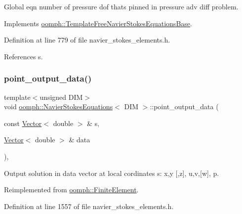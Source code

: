 Global eqn number of pressure dof that\textquotesingle{}s pinned in pressure adv diff problem. 



Implements \hyperlink{classoomph_1_1TemplateFreeNavierStokesEquationsBase_a7b4c21107580d63e358ae7469f04399c}{oomph\+::\+Template\+Free\+Navier\+Stokes\+Equations\+Base}.



Definition at line 779 of file navier\+\_\+stokes\+\_\+elements.\+h.



References s.

\mbox{\label{classoomph_1_1NavierStokesEquations_afd6f8376bf83a87164cd3c490270798e}} 
\subsubsection{\texorpdfstring{point\+\_\+output\+\_\+data()}{point\_output\_data()}}
{\footnotesize\ttfamily template$<$unsigned D\+IM$>$ \\
void \hyperlink{classoomph_1_1NavierStokesEquations}{oomph\+::\+Navier\+Stokes\+Equations}$<$ D\+IM $>$\+::point\+\_\+output\+\_\+data (\begin{DoxyParamCaption}\item[{const \hyperlink{classoomph_1_1Vector}{Vector}$<$ double $>$ \&}]{s,  }\item[{\hyperlink{classoomph_1_1Vector}{Vector}$<$ double $>$ \&}]{data }\end{DoxyParamCaption})\hspace{0.3cm}{\ttfamily [inline]}, {\ttfamily [virtual]}}



Output solution in data vector at local cordinates s\+: x,y \mbox{[},z\mbox{]}, u,v,\mbox{[}w\mbox{]}, p. 



Reimplemented from \hyperlink{classoomph_1_1FiniteElement_a8bf3f75b55d4e67b644df3e22c192596}{oomph\+::\+Finite\+Element}.



Definition at line 1557 of file navier\+\_\+stokes\+\_\+elements.\+h.



